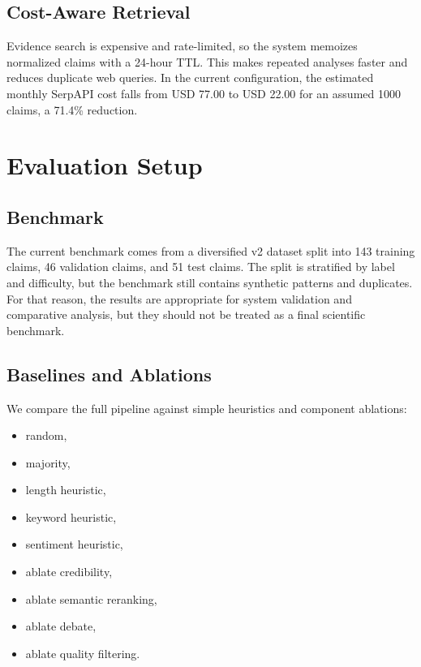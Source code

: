 \documentclass[11pt,a4paper]{article}
\begin{document}
\subsection{Cost-Aware Retrieval}

Evidence search is expensive and rate-limited, so the system memoizes normalized claims with a 24-hour TTL. This makes repeated analyses faster and reduces duplicate web queries. In the current configuration, the estimated monthly SerpAPI cost falls from USD 77.00 to USD 22.00 for an assumed 1000 claims, a 71.4\% reduction.

\section{Evaluation Setup}

\subsection{Benchmark}

The current benchmark comes from a diversified v2 dataset split into 143 training claims, 46 validation claims, and 51 test claims. The split is stratified by label and difficulty, but the benchmark still contains synthetic patterns and duplicates. For that reason, the results are appropriate for system validation and comparative analysis, but they should not be treated as a final scientific benchmark.

\subsection{Baselines and Ablations}

We compare the full pipeline against simple heuristics and component ablations:

\begin{itemize}
  \item random,
  \item majority,
  \item length heuristic,
  \item keyword heuristic,
  \item sentiment heuristic,
  \item ablate credibility,
  \item ablate semantic reranking,
  \item ablate debate,
  \item ablate quality filtering.
\end{itemize}
\end{document}
